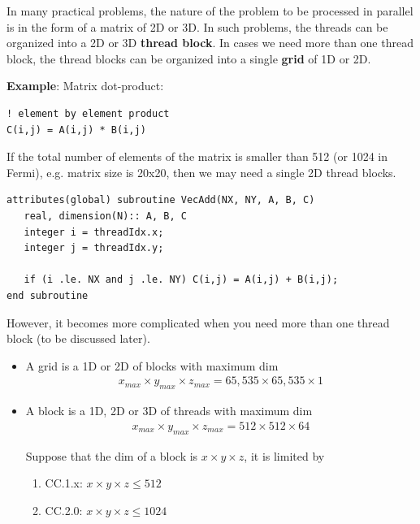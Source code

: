In many practical problems, the nature of the problem to be processed
in parallel is in the form of a matrix of 2D or 3D. In such problems,
the threads can be organized into a 2D or 3D {\bf thread block}. In
cases we need more than one thread block, the thread blocks can be
organized into a single {\bf grid} of 1D or 2D.

{\bf Example}: Matrix dot-product:
\begin{verbatim}
! element by element product
C(i,j) = A(i,j) * B(i,j)
\end{verbatim}
If the total number of elements of the matrix is smaller than 512 (or
1024 in Fermi), e.g. matrix size is 20x20, then we may need a single
2D thread blocks. 
\begin{lstlisting}
attributes(global) subroutine VecAdd(NX, NY, A, B, C)
   real, dimension(N):: A, B, C
   integer i = threadIdx.x;
   integer j = threadIdx.y;

   if (i .le. NX and j .le. NY) C(i,j) = A(i,j) + B(i,j);
end subroutine
\end{lstlisting}
However, it becomes more complicated when you need more than one
thread block (to be discussed later). 


\begin{framed}
  
\begin{itemize}
\item A grid is a 1D or 2D of blocks with maximum dim
  \begin{eqnarray}
    \label{eq:97}
    x_{max} \times y_{max} \times z_{max} = 65,535\times 65,535 \times 1
  \end{eqnarray}
\item A block is a 1D, 2D or 3D of threads with maximum dim
  \begin{eqnarray}
    \label{eq:98}
    x_{max} \times y_{max} \times z_{max} =  512\times 512 \times 64
  \end{eqnarray}

Suppose that the dim of a block is $x\times y\times z$, it is limited
by 
\begin{enumerate}
\item CC.1.x: $x\times y \times z \le 512$
\item CC.2.0: $x\times y \times z \le 1024$
\end{enumerate}
\end{itemize}

\end{framed}

